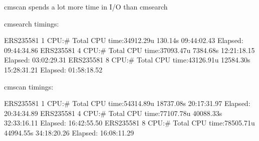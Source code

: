 \documentclass[landscape]{slides}
\begin{document}
\begin{slide}
\begin{center}
cmscan spends a lot more time in I/O than cmsearch
\medskip

\begin{sreoutput}
cmsearch timings:

ERS235581 1 CPU:# Total CPU time:34912.29u 130.14s   09:44:02.43 Elapsed: 09:44:34.86
ERS235581 4 CPU:# Total CPU time:37093.47u 7384.68s  12:21:18.15 Elapsed: 03:02:29.31
ERS235581 8 CPU:# Total CPU time:43126.91u 12584.30s 15:28:31.21 Elapsed: 01:58:18.52




cmscan timings:

ERS235581 1 CPU:# Total CPU time:54314.89u 18737.08s 20:17:31.97 Elapsed: 20:34:34.89
ERS235581 4 CPU:# Total CPU time:77107.78u 40088.33s 32:33:16.11 Elapsed: 16:42:55.50
ERS235581 8 CPU:# Total CPU time:78505.71u 44994.55s 34:18:20.26 Elapsed: 16:08:11.29
\end{sreoutput}

\vfill
\end{center}
\end{slide}
\end{document}
